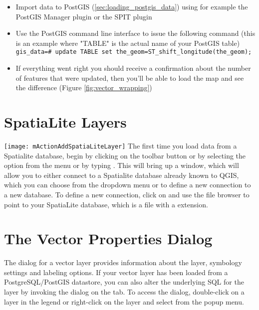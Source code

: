 
\begin{itemize}
\item Import data to PostGIS (\ref{sec:loading_postgis_data}) using for
example the PostGIS Manager plugin or the SPIT plugin
\item Use the PostGIS command line interface to issue the following command
(this is an example where "TABLE" is the actual name of your PostGIS table) \\ 
\texttt{gis\_data=\# update TABLE set the\_geom=ST\_shift\_longitude(the\_geom);} 
\item If everything went right you should receive a confirmation about the
number of features that were updated, then you'll be able to load the map and
see the difference (Figure \ref{fig:vector_wrapping})
\end{itemize}

\section{SpatiaLite Layers} 
\label{label_spatialite} 

\texttt{[image: mActionAddSpatiaLiteLayer]}
The first time you load data from a Spatialite database, begin by clicking on the 
 toolbar button or by selecting the 
option from the  menu or by typing . 
This will bring up a window, which will allow you to either connect to a Spatialite database already known to QGIS, which 
you can choose from the dropdown menu or to define a new connection to a new database. To define a new connection, 
click on  and use the file browser to point to your SpatiaLite database, 
which is a file with a  extension.

\section{The Vector Properties Dialog}\label{sec:vectorprops}

The  dialog for a vector layer provides information
about the layer, symbology settings and labeling options. If your vector
layer has been loaded from a PostgreSQL/PostGIS datastore, you can also alter
the underlying SQL for the layer by invoking the 
dialog on the  tab. 
To access the  dialog, double-click on a layer in
the legend or right-click on the layer and select 
from the popup menu.

